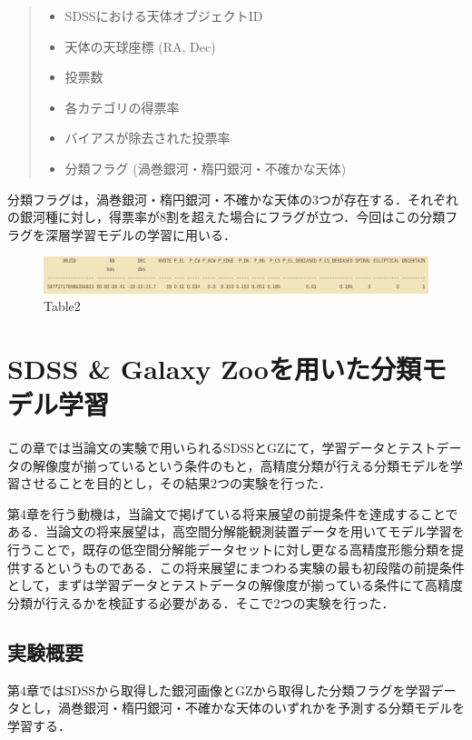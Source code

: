\documentclass[a4j, 11pt]{jreport}
\begin{document}
\begin{quote}
 \begin{itemize}
	\item SDSSにおける天体オブジェクトID
	\item 天体の天球座標 (RA, Dec)
	\item 投票数
	\item 各カテゴリの得票率
	\item バイアスが除去された投票率
	\item 分類フラグ (渦巻銀河・楕円銀河・不確かな天体)
 \end{itemize}
\end{quote}

分類フラグは，渦巻銀河・楕円銀河・不確かな天体の3つが存在する．それぞれの銀河種に対し，得票率が8割を超えた場合にフラグが立つ．今回はこの分類フラグを深層学習モデルの学習に用いる．

\begin{figure}[h]
 \centering
 \includegraphics[width=18cm]{images/table2.png}
 \caption{Table2}
 \label{fig:table2}
\end{figure}

\newpage
\chapter{SDSS \& Galaxy Zooを用いた分類モデル学習}
この章では当論文の実験で用いられるSDSSとGZにて，学習データとテストデータの解像度が揃っているという条件のもと，高精度分類が行える分類モデルを学習させることを目的とし，その結果2つの実験を行った．

第4章を行う動機は，当論文で掲げている将来展望の前提条件を達成することである．当論文の将来展望は，高空間分解能観測装置データを用いてモデル学習を行うことで，既存の低空間分解能データセットに対し更なる高精度形態分類を提供するというものである．この将来展望にまつわる実験の最も初段階の前提条件として，まずは学習データとテストデータの解像度が揃っている条件にて高精度分類が行えるかを検証する必要がある．そこで2つの実験を行った．

\section{実験概要}
第4章ではSDSSから取得した銀河画像とGZから取得した分類フラグを学習データとし，渦巻銀河・楕円銀河・不確かな天体のいずれかを予測する分類モデルを学習する．
\end{document}
